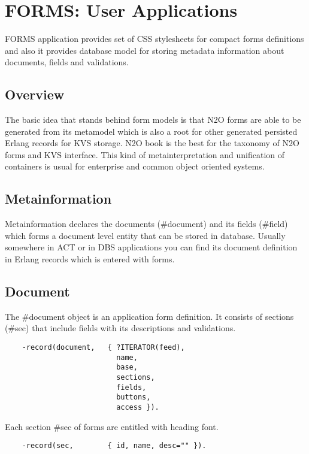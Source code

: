 \section{FORMS: User Applications}
FORMS application provides set of CSS stylesheets for compact forms definitions
and also it provides database model for storing metadata information about
documents, fields and validations.

\subsection{Overview}
The basic idea that stands behind form models is that N2O forms are able to be
generated from its metamodel which is also a root for other generated
persisted Erlang records for KVS storage. N2O book is the best for the taxonomy
of N2O forms and KVS interface. This kind of metainterpretation and unification of
containers is usual for enterprise and common object oriented systems.

\subsection{Metainformation}
Metainformation declares the documents (\#document) and its
fields (\#field) which forms a document level entity that can
be stored in database. Usually somewhere in ACT or in DBS
applications you can find its document definition in Erlang
records which is entered with forms.

\subsection{Document}
The \#document object is an application form definition.
It consists of sections (\#sec) that include fields with
its descriptions and validations.

\vspace{1\baselineskip}
\begin{lstlisting}
    -record(document,   { ?ITERATOR(feed),
                          name,
                          base,
                          sections,
                          fields,
                          buttons,
                          access }).
\end{lstlisting}

Each section \#sec of forms are entitled with heading font.

\vspace{1\baselineskip}
\begin{lstlisting}
    -record(sec,        { id, name, desc="" }).
\end{lstlisting}

